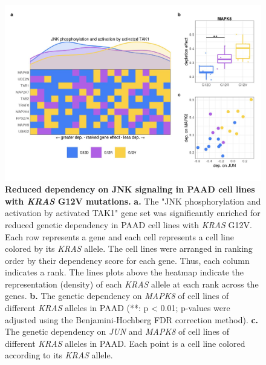 \documentclass[english, 12pt, letterpaper]{article}
\newcommand{\KRAS}{\emph{KRAS}}
\begin{document}
\begin{figure}
\centering
\includegraphics[width=\textwidth]{figures/SuppFigure_14.jpeg}
\caption{
    \textbf{Reduced dependency on JNK signaling in PAAD cell lines with \KRAS{} G12V mutations.}
    \textbf{a.} The "JNK phosphorylation and activation by activated TAK1" gene set was significantly enriched for reduced genetic dependency in PAAD cell lines with \KRAS{} G12V. Each row represents a gene and each cell represents a cell line colored by its \KRAS{} allele. The cell lines were arranged in ranking order by their dependency score for each gene. Thus, each column indicates a rank. The lines plots above the heatmap indicate the representation (density) of each \KRAS{} allele at each rank across the genes.
    \textbf{b.} The genetic dependency on \emph{MAPK8} of cell lines of different \KRAS{} alleles in PAAD (**: p < 0.01; p-values were adjusted using the Benjamini-Hochberg FDR correction method).
    \textbf{c.} The genetic dependency on \emph{JUN} and \emph{MAPK8} of cell lines of different \KRAS{} alleles in PAAD. Each point is a cell line colored according to its \KRAS{} allele.
}
\label{sfig:paad-dependency-JUN}
\end{figure}
\end{document}
